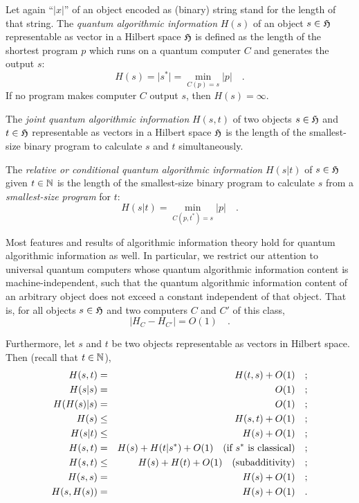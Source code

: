  Let again ``$\vert x \vert$'' of an object encoded as (binary) string
 stand for the length of that string.
The {\em quantum algorithmic information} $H(s)$ of an object $s\in
{\cal H}$
 representable as  vector in a Hilbert space ${\cal H}$ is defined as
the length
of the shortest  program $p$ which runs on a quantum computer
 $C$ and generates
the output $s$:
 \begin{equation}
H(s)=\vert s^\ast \vert =\min_{C(p)=s} \vert p\vert \quad .
 \end{equation}
If no program makes computer $C$ output $s$, then $H(s)=\infty $.


 The {\em joint quantum algorithmic information}
 $H(s,t)$ of two objects   $s\in {\cal H}$ and $t\in {\cal H}$
representable as vectors in a Hilbert space ${\cal H}$
 is the length of the smallest-size binary program to calculate
 $s$ and $t$ simultaneously.

 The {\em relative or conditional quantum algorithmic information}
 $H(s\vert t)$ of  $s\in {\cal H}$ given $t\in {\Bbb N}$
 is the length of the
 smallest-size binary program to calculate $s$ from a
{\em  smallest-size program} for $t$:
 \begin{equation}
H(s\vert t)=\min_{C(p,t^\ast )=s} \vert p\vert \quad .
 \end{equation}

Most features and results of algorithmic information theory hold for
quantum algorithmic information as well. In particular, we restrict our
attention to universal quantum computers whose quantum algorithmic
information content is machine-independent, such that the quantum
algorithmic information content of an arbitrary object does not exceed a
constant independent of that object. That is, for all objects $s\in
{\cal H}$ and two computers $C$ and $C'$ of this class,
 \begin{equation}
\vert H_C-H_{C'}\vert
=O(1)\quad . \label{machine-independence}
 \end{equation}

Furthermore, let $s$ and $t$ be two objects representable as vectors in
Hilbert space. Then (recall that $t\in {\Bbb N}$),
 \begin{eqnarray}
 H(s,t)&=& H(t,s)+O(1)\quad ;\\
 H(s\vert s)&=&O(1)\quad ;\\
 H(H(s)\vert s)&=&O(1)\quad ;\\
 H(s)&\le & H(s,t)+O(1)\quad ;\\
 H(s\vert t)&\le &H(s)+O(1)\quad ;\\
 H(s,t)&= & H(s)+H(t\vert s^\ast )+O(1) \quad \mbox{(if }s^\ast \mbox{
is classical)}
\label{subadditivity1} \quad ;\\
 H(s,t)&\le & H(s)+H(t)+O(1) \quad {\rm
 (subadditivity)}\label{subadditivity} \quad ;\\
 H(s,s)&=&H(s)+O(1)\quad ;\\
 H(s,H(s))&=&H(s)+O(1)\quad .
 \end{eqnarray}

